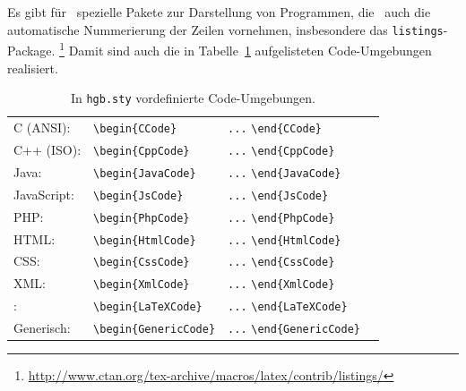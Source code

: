 Es gibt für \latex\ spezielle Pakete zur Darstellung von Programmen, die \ua\ auch die automatische Nummerierung der Zeilen vornehmen, insbesondere das \texttt{listings}-Package.%
\footnote{\url{http://www.ctan.org/tex-archive/macros/latex/contrib/listings/}}
Damit sind auch die in Tabelle~\ref{tab:CodeUmgebungen} aufgelisteten Code-Umgebungen 
realisiert.
%
\begin{table}
\caption{In \nolinkurl{hgb.sty} vordefinierte Code-Umgebungen.}
\label{tab:CodeUmgebungen}
\centering
\begin{tabular}{llll}
	\hline
	C (ANSI):   & \verb!\begin{CCode}! & \verb!...! \verb!\end{CCode}! \\
	C++ (ISO):  & \verb!\begin{CppCode}! & \verb!...! \verb!\end{CppCode}! \\
	Java:       & \verb!\begin{JavaCode}! & \verb!...! \verb!\end{JavaCode}! \\
	JavaScript:  			& \verb!\begin{JsCode}! & \verb!...! \verb!\end{JsCode}! \\
	PHP:  			& \verb!\begin{PhpCode}! & \verb!...! \verb!\end{PhpCode}! \\
	HTML:  			& \verb!\begin{HtmlCode}! & \verb!...! \verb!\end{HtmlCode}! \\
	CSS:  			& \verb!\begin{CssCode}! & \verb!...! \verb!\end{CssCode}! \\
	XML:  			& \verb!\begin{XmlCode}! & \verb!...! \verb!\end{XmlCode}! \\
	\latex:     & \verb!\begin{LaTeXCode}! & \verb!...! \verb!\end{LaTeXCode}! \\
	Generisch:  & \verb!\begin{GenericCode}! & \verb!...! \verb!\end{GenericCode}! \\
	\hline
\end{tabular}
\end{table}
